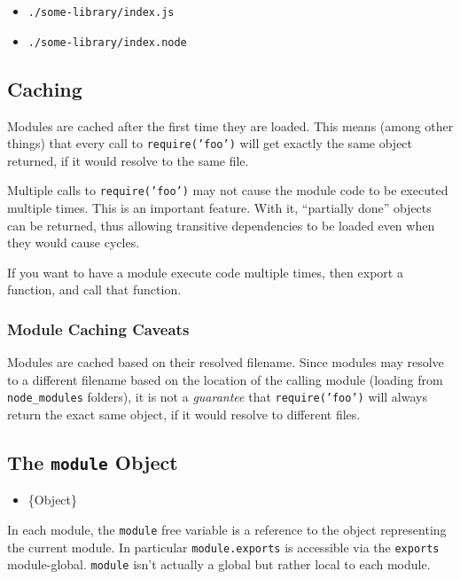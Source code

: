 \begin{itemize}
\item
  \texttt{./some-library/index.js}
\item
  \texttt{./some-library/index.node}
\end{itemize}

\subsection{Caching}

Modules are cached after the first time they are loaded. This means
(among other things) that every call to \texttt{require('foo')} will get
exactly the same object returned, if it would resolve to the same file.

Multiple calls to \texttt{require('foo')} may not cause the module code
to be executed multiple times. This is an important feature. With it,
``partially done'' objects can be returned, thus allowing transitive
dependencies to be loaded even when they would cause cycles.

If you want to have a module execute code multiple times, then export a
function, and call that function.

\subsubsection{Module Caching Caveats}

Modules are cached based on their resolved filename. Since modules may
resolve to a different filename based on the location of the calling
module (loading from \texttt{node\_modules} folders), it is not a
\emph{guarantee} that \texttt{require('foo')} will always return the
exact same object, if it would resolve to different files.

\subsection{The \texttt{module} Object}

\begin{itemize}
\item
  \{Object\}
\end{itemize}

In each module, the \texttt{module} free variable is a reference to the
object representing the current module. In particular
\texttt{module.exports} is accessible via the \texttt{exports}
module-global. \texttt{module} isn't actually a global but rather local
to each module.

